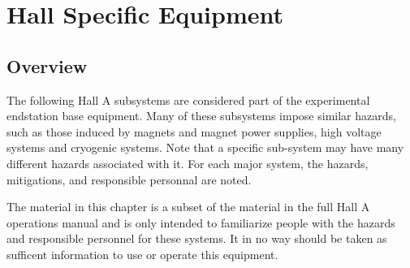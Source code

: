 %
%
\chapter{Hall Specific Equipment}

\section{Overview}

        The following Hall A subsystems are considered part of the experimental endstation base equipment.
Many of these subsystems impose similar hazards, such as those induced by magnets and magnet power supplies,
high voltage systems and cryogenic systems.  Note that a specific sub-system may have many different hazards associated with it.
For each major system, the hazards, mitigations, and responsible personnal are noted.

The material in this chapter is a subset of the material in the full Hall A operations manual and is only intended to familiarize
people with the hazards and responsible personnel for these systems.  It in no way should be taken as sufficent information to
use or operate this equipment.

%
%

